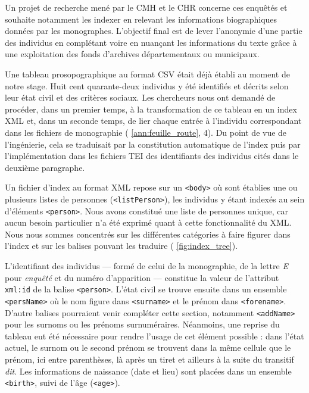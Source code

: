 Un projet de recherche mené par le CMH et le CHR concerne ces enquêtés et souhaite notamment les indexer en relevant les informations biographiques données par les monographes. L'objectif final est de lever l'anonymie d'une partie des individus en complétant voire en nuançant les informations du texte grâce à une exploitation des fonds d'archives départementaux ou municipaux.

Une tableau prosopographique au format CSV était déjà établi au moment de notre stage. Huit cent quarante-deux individus y été identifiés et décrits selon leur état civil et des critères sociaux. Les chercheurs nous ont demandé de procéder, dans un premier temps, à la transformation de ce tableau en un  index XML et, dans un seconde temps, de lier chaque entrée à l'individu correspondant dans les fichiers de monographie (\ann{} \ref{ann:feuille_route}, \issue{} 4). Du point de vue de l'ingénierie, cela se traduisait par la constitution automatique de l'index puis par l'implémentation dans les fichiers TEI des identifiants des individus cités dans le deuxième paragraphe.

Un fichier d'index au format XML repose sur un \texttt{<body>} où sont établies une ou plusieurs listes de personnes (\texttt{<listPerson>}), les individus y étant indexés au sein d'éléments \texttt{<person>}. Nous avons constitué une liste de personnes unique, car aucun besoin particulier n'a été exprimé quant à cette fonctionnalité du XML. Nous nous sommes concentrés sur les différentes catégories à faire figurer dans l'index et sur les balises pouvant les traduire (\fig{} \ref{fig:index_tree}).

L'identifiant des individus --- formé de celui de la monographie, de la lettre \textit{E} pour \textit{enquêté} et du numéro d'apparition --- constitue la valeur de l'attribut \texttt{xml:id} de la balise \texttt{<person>}. L'état civil se trouve ensuite dans un ensemble \texttt{<persName>} où le nom figure dans \texttt{<surname>} et le prénom dans \texttt{<forename>}. D'autre balises pourraient venir compléter cette section, notamment \texttt{<addName>} pour les surnoms ou les prénoms surnuméraires. Néanmoins, une reprise du tableau eut été nécessaire pour rendre l'usage de cet élément possible : dans l'état actuel, le surnom ou le second prénom se trouvent dans la même cellule que le prénom, ici entre parenthèses, là après un tiret et ailleurs à la suite du transitif \textit{dit}. Les informations de naissance (date et lieu) sont placées dans un ensemble \texttt{<birth>}, suivi de l'âge (\texttt{<age>}).

